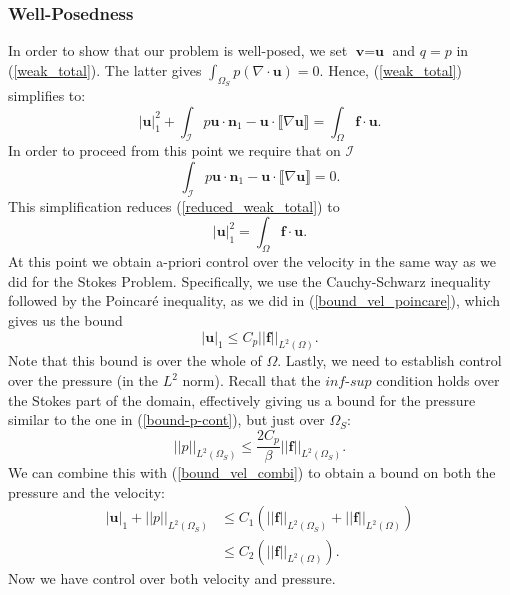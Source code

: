 \documentclass[12pt,a4paper]{article}
\theoremstyle{definition}
\begin{document}
\subsubsection{Well-Posedness}
 In order to show that our problem is well-posed, we set $\textbf{v}=\textbf{u}$  and $q=p$ in (\ref{weak_total}).  The latter gives $\int_{\Omega_S}p\left(\nabla \cdot \textbf{u}\right)=0$.  Hence, (\ref{weak_total}) simplifies to:
\begin{equation}\label{reduced_weak_total}
	\left|\textbf{u}\right|_1^2 + \int_{\mathcal{I}}p\textbf{u}\cdot \textbf{n}_1-\textbf{u}\cdot\llbracket \nabla \textbf{u}\rrbracket =\int_{\Omega}\textbf{f}\cdot \textbf{u}.
\end{equation}
In order to proceed from this point we require that on $\mathcal{I}$
\begin{equation}
\int_{\mathcal{I}}p\textbf{u}\cdot \textbf{n}_1-\textbf{u}\cdot \llbracket \nabla \textbf{u}\rrbracket=0.
\end{equation}
This simplification reduces (\ref{reduced_weak_total}) to 
\begin{equation}
\left|\textbf{u}\right|_1^2 =\int_{\Omega}\textbf{f}\cdot \textbf{u}.
\end{equation}
At this point we obtain a-priori control over the velocity in the same way as we did for the Stokes Problem.  Specifically, we use the Cauchy-Schwarz inequality followed by the Poincar{\'e} inequality, as we did in (\ref{bound_vel_poincare}), which gives us the bound
\begin{equation}\label{bound_vel_combi}
	\left|\textbf{u}\right|_1\leq C_p\left|\left|\textbf{f}\right|\right|_{L^2\left(\Omega\right)}.
\end{equation}
Note that this bound is over the whole of $\Omega$. Lastly, we need to establish control over the pressure (in the $L^2$ norm).  Recall that the $\textit{inf-sup}$ condition holds over the Stokes part of the domain, effectively giving us a bound for the pressure similar to the one in (\ref{bound-p-cont}), but just over $\Omega_S$:
\begin{equation}
\left|\left|p\right|\right|_{L^2\left(\Omega_S\right)} \leq \frac{2C_p}{\beta}\left|\left|\textbf{f}\right|\right|_{L^2\left(\Omega_S\right)}.
\end{equation}
We can combine this with (\ref{bound_vel_combi}) to obtain a bound on both the pressure and the velocity:
\begin{equation}
\begin{aligned}
\left|\textbf{u}\right|_1+\left|\left|p\right|\right|_{L^2\left(\Omega_S\right)}&\leq C_1\left(\left|\left|\textbf{f}\right|\right|_{L^2\left(\Omega_S\right)}+\left|\left|\textbf{f}\right|\right|_{L^2\left(\Omega\right)}\right)\\
&\leq C_2\left(\left|\left|\textbf{f}\right|\right|_{L^2\left(\Omega\right)}\right).
\end{aligned}
\end{equation}
Now we have control over both  velocity and  pressure.
\end{document}
